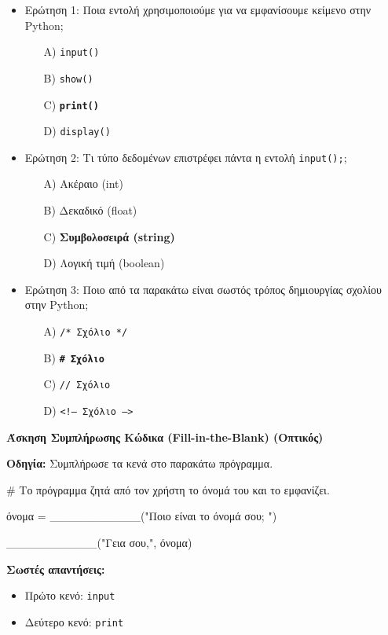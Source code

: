 \documentclass[11pt]{report}
\begin{document}
\begin{itemize}
    \item Ερώτηση 1: Ποια εντολή χρησιμοποιούμε για να εμφανίσουμε κείμενο στην Python;
    \begin{itemize}
        \item[A)] \texttt{input()}
        \item[B)] \texttt{show()}
        \item[C)] \textbf{\texttt{print()}}
        \item[D)] \texttt{display()}
    \end{itemize}

    \item Ερώτηση 2: Τι τύπο δεδομένων επιστρέφει πάντα η εντολή \texttt{input();};
    \begin{itemize}
        \item[A)] Ακέραιο (int)
        \item[B)] Δεκαδικό (float)
        \item[C)] \textbf{Συμβολοσειρά (string)}
        \item[D)] Λογική τιμή (boolean)
    \end{itemize}

    \item Ερώτηση 3: Ποιο από τα παρακάτω είναι σωστός τρόπος δημιουργίας σχολίου στην Python;
    \begin{itemize}
        \item[A)] \texttt{/* Σχόλιο */}
        \item[B)] \textbf{\texttt{\# Σχόλιο}}
        \item[C)] \texttt{// Σχόλιο}
        \item[D)] \texttt{<!-- Σχόλιο -->}
    \end{itemize}
\end{itemize}

\textbf{Άσκηση Συμπλήρωσης Κώδικα (Fill-in-the-Blank) (Οπτικός)}

\textbf{Οδηγία:} Συμπλήρωσε τα κενά στο παρακάτω πρόγραμμα.

\begin{tcolorbox}[colback=white, colframe=black!75!black]
\# Το πρόγραμμα ζητά από τον χρήστη το όνομά του και το εμφανίζει.

όνομα = \_\_\_\_\_\_\_\_\_\_\_("Ποιο είναι το όνομά σου; ")

\_\_\_\_\_\_\_\_\_\_\_("Γεια σου,", όνομα)
\end{tcolorbox}

\textbf{Σωστές απαντήσεις:}
\begin{itemize}
    \item Πρώτο κενό: \texttt{input}
    \item Δεύτερο κενό: \texttt{print}
\end{itemize}
\end{document}
